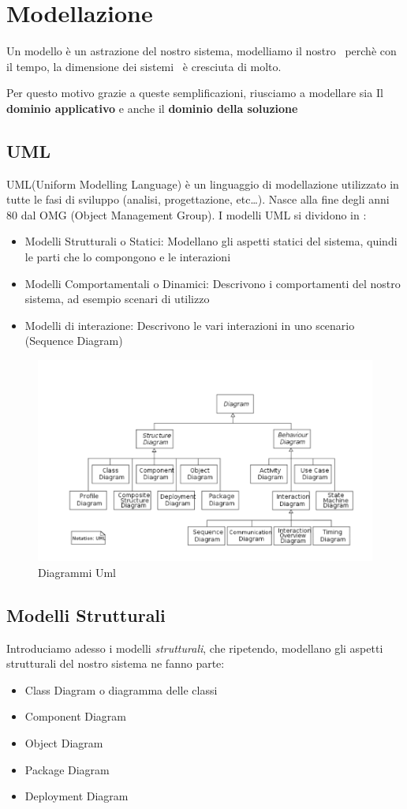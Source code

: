 \section{Modellazione}
Un modello \`e un astrazione del nostro sistema, modelliamo il nostro \sw\ perch\`e con
il tempo, la dimensione dei sistemi \sw\ \`e cresciuta di molto.

Per questo motivo grazie a queste semplificazioni, riusciamo a modellare sia Il
\textbf{dominio applicativo} e anche il \textbf{dominio della soluzione}

\subsection{UML}
UML(Uniform Modelling Language) \`e un linguaggio di modellazione utilizzato in tutte le fasi
di sviluppo (analisi, progettazione, etc\dots). 
Nasce alla fine degli anni 80 dal OMG (Object Management Group).
I modelli UML si dividono in :
\begin{itemize}
    \item Modelli Strutturali o Statici:
        Modellano gli aspetti statici del sistema, quindi le parti che lo compongono e le interazioni 
    \item Modelli Comportamentali o Dinamici:
        Descrivono i comportamenti del nostro sistema, ad esempio scenari di utilizzo
    \item Modelli di interazione:
        Descrivono le vari interazioni in uno scenario (Sequence Diagram)
\end{itemize}
\begin{figure}[htbp]
    \centering
    \includegraphics[scale=0.6]{Modelli_uml.PNG}
    \caption{Diagrammi Uml}
    \label{fig:uml}
\end{figure}
\subsection{Modelli Strutturali}
Introduciamo adesso i modelli \emph{strutturali}, che ripetendo, modellano gli aspetti strutturali
del nostro sistema ne fanno parte:
\begin{itemize}
    \item Class Diagram o diagramma delle classi
    \item Component Diagram
    \item Object Diagram
    \item Package Diagram
    \item Deployment Diagram
\end{itemize}
